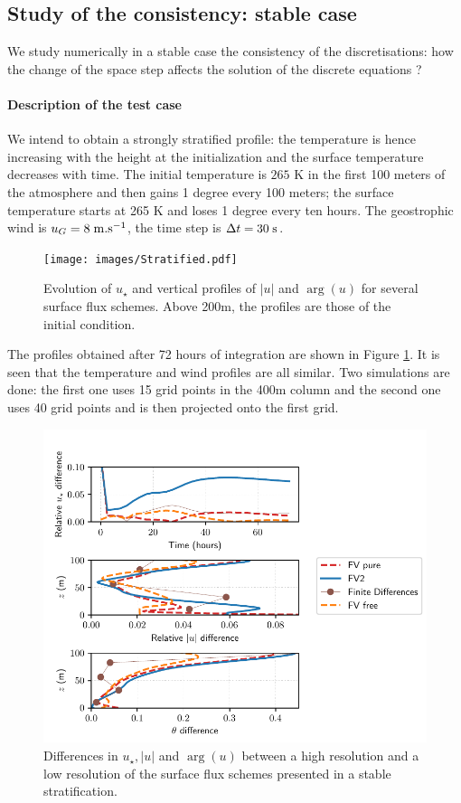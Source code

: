 \subsection{Study of the consistency: stable case}
We study numerically in a stable case the consistency of the
discretisations: how the change of the space step affects the
solution of the discrete equations ?
\paragraph{Description of the test case}
We intend to obtain a strongly stratified profile: the temperature
is hence increasing with the height at the initialization and
the surface temperature decreases with time.
The initial temperature is $265$ K in the first 100 meters of the
atmosphere and then gains 1 degree every 100 meters;
the surface temperature starts at 265 K and loses
1 degree every ten hours.
The geostrophic wind is $u_G = 8 \;{\rm m}.{\rm s}^{-1}$,
the time step is $\Delta t = 30 \;{\rm s}$.
\begin{figure}
	\centering
\texttt{[image: images/Stratified.pdf]}
	\caption{ Evolution of $u_\star$ and
		vertical profiles of $|u|$ and $\arg(u)$ for
		several surface flux schemes. Above 200m,
		the profiles are those of the initial condition.
	}
	\label{fig:ND_Consistency_Stratified}
\end{figure}
The profiles obtained after 72 hours of integration are
shown in Figure \ref{fig:ND_Consistency_Stratified}.
It is seen that the temperature and wind profiles are
all similar.
Two simulations are done: the first one uses 15 grid points
in the 400m column and the second one uses 40 grid points and is then
projected onto the first grid.
\begin{figure}
	\centering
\includegraphics[scale=0.6]{images/consistency_comparisonStratified.pdf}
	\caption{Differences in $u_\star, |u|$ and $\arg(u)$
	between a high resolution and a low resolution
	of the surface flux schemes presented in a stable
	stratification.
	}
	\label{fig:ND_Consistency_comparisonStratified}
\end{figure}
